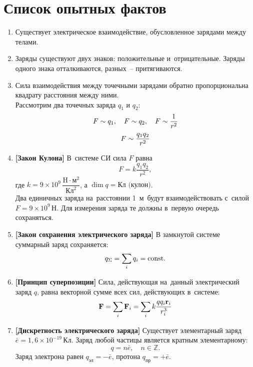 \section{Список опытных фактов}

	\begin{enumerate}
		\item Существует электрическое взаимодействие, обусловленное зарядами между телами.
		\item Заряды существуют двух знаков: положительные и~отрицательные. Заряды одного знака отталкиваются, разных~-- притягиваются.
		\item Сила взаимодействия между точечными зарядами обратно пропорциональна квадрату расстояния между ними. \\
				Рассмотрим два точечных заряда $q_1$ и $q_2$:
					$$F \prop q_1, \quad F \prop q_2, \quad F \prop \frac{1}{r^2}$$
					$$F \prop \frac{q_1q_2}{r^2}$$
		\item \textbf{[Закон Кулона]} В~системе СИ сила $F$ равна
				\begin{equation}\label{1}
					F=k\frac{q_1q_2}{r^2},
				\end{equation}
				где $k=9 \times 10^9 \,\dfrac{\text{H}\cdot \text{м}^2}{\text{Кл}^2}$, а $\dim{q}=\text{Кл (кулон)}$. \\
				Два единичных заряда на~расстоянии 1~м~будут взаимодействовать с~силой $F=9\times 10^9 \, \text{Н}$. Для измерения заряда те должны в~первую очередь сохраняться.
		\item \textbf{[Закон сохранения электрического заряда]} В замкнутой системе суммарный заряд сохраняется:
					$$q_{\Sigma}=\sum_i q_i=\c.$$
		\item \textbf{[Принцип суперпозиции]} Сила, действующая на~данный электрический заряд $q$, равна векторной сумме всех сил, действующих в~системе:
				\begin{equation}\label{2}
					\vec{F} = \sum_i \vec{F}_i = \sum_i k\frac{qq_i\vec{r}_i}{r_i^3} \\
				\end{equation} 
		\item \textbf{[Дискретность электрического заряда]} Существует элементарный заряд $\bar{e}=1,6 \times 10^{-19} \, \text{Кл}$. Заряд любой частицы является кратным элементарному:
					$$q=n\bar{e}, \quad n \in \mathbb{Z}.$$
					Заряд электрона равен $q_{\text{эл}}=-\bar{e}$, протона $q_{\text{пр}}=+\bar{e}$.
	\end{enumerate}